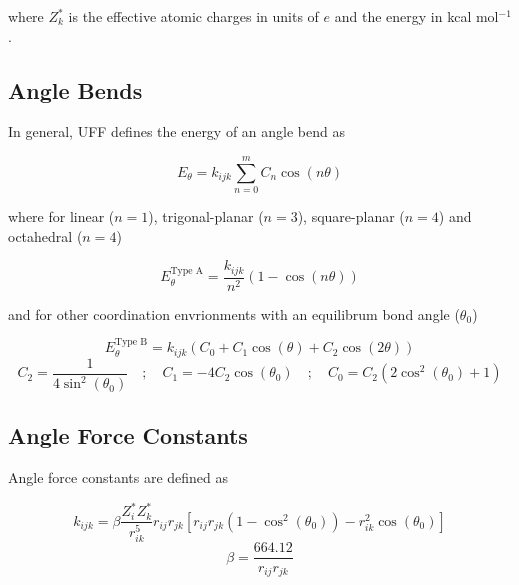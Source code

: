 \documentclass[10pt]{article}
\begin{document}
where $Z_k^*$ is the effective atomic charges in units of $e$ and the energy in
kcal mol$^{-1}$.

\subsection{Angle Bends}

In general, UFF defines the energy of an angle bend as

\begin{equation}
    E_{\theta} = k_{ijk} \sum_{n=0}^m C_n \cos(n\theta)
\end{equation}

where for linear ($n=1$), trigonal-planar ($n=3$), square-planar ($n=4$) and
octahedral ($n=4$)

\begin{equation}
    E_{\theta}^\text{Type A} = \frac{k_{ijk}}{n^2} (1 - \cos(n\theta))
\end{equation}

and for other coordination envrionments with an equilibrum bond angle ($\theta_0$)

\begin{equation}
    E_{\theta}^\text{Type B} = k_{ijk}(C_0 + C_1\cos(\theta) + C_2\cos(2\theta))
\end{equation}
\begin{equation}
    C_2 = \frac{1}{4\sin^2(\theta_0)} \quad ;\quad C_1 = -4C_2\cos(\theta_0)
    \quad ; \quad C_0 = C_2(2\cos^2(\theta_0) + 1)
\end{equation}

\subsection{Angle Force Constants}

Angle force constants are defined as

\begin{equation}
    k_{ijk} = \beta \frac{Z_i^* Z_k^*}{r_{ik}^5} r_{ij}r_{jk}
    \left[r_{ij}r_{jk}(1-\cos^2(\theta_0)) - r_{ik}^2\cos(\theta_0) \right]
\end{equation}
\begin{equation}
    \beta = \frac{664.12}{r_{ij} r_{jk}}
\end{equation}
\end{document}
